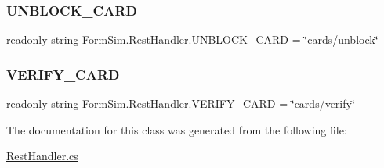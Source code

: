 \subsubsection{\texorpdfstring{U\+N\+B\+L\+O\+C\+K\+\_\+\+C\+A\+RD}{UNBLOCK\_CARD}}
{\footnotesize\ttfamily readonly string Form\+Sim.\+Rest\+Handler.\+U\+N\+B\+L\+O\+C\+K\+\_\+\+C\+A\+RD = \char`\"{}cards/unblock\char`\"{}\hspace{0.3cm}{\ttfamily [private]}}

\mbox{\label{class_form_sim_1_1_rest_handler_adbde7c45aab3b4a97cf1464065161dcd}} 
\subsubsection{\texorpdfstring{V\+E\+R\+I\+F\+Y\+\_\+\+C\+A\+RD}{VERIFY\_CARD}}
{\footnotesize\ttfamily readonly string Form\+Sim.\+Rest\+Handler.\+V\+E\+R\+I\+F\+Y\+\_\+\+C\+A\+RD = \char`\"{}cards/verify\char`\"{}\hspace{0.3cm}{\ttfamily [private]}}



The documentation for this class was generated from the following file\+:\begin{DoxyCompactItemize}
\item 
\mbox{\hyperlink{_rest_handler_8cs}{Rest\+Handler.\+cs}}\end{DoxyCompactItemize}
